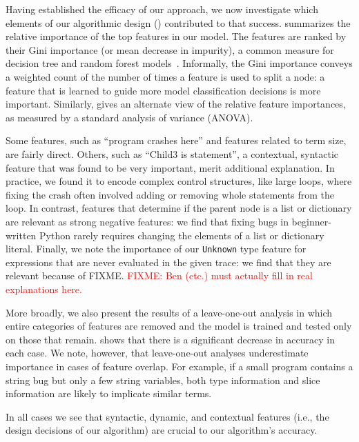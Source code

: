 \documentclass[conference]{IEEEtran}
\newcommand{\fixme}[1]{\textcolor{red}{FIXME: #1}}
\newcommand\lt[1]{{\lstinline|#1|}}
\begin{document}
Having established the efficacy of our approach, we now investigate which
elements of our algorithmic design () contributed to that
success.
 summarizes the relative importance
of the top features in our model. The features are ranked by their
Gini importance (or mean decrease in impurity), a common measure
for decision tree and random forest models~\cite{breiman2001random}. Informally, the
Gini importance conveys a weighted count of the number of times a feature
is used to split a node: a feature that is learned to guide more model
classification decisions is more important. Similarly,  gives
an alternate view of the relative feature importances, as measured by a
standard analysis of variance (ANOVA).

Some features, such as ``program crashes here'' and features
related to term size, are fairly direct. Others, such as ``Child3 is
statement'', a contextual, syntactic feature that was found to be very
important, merit additional explanation. In practice, we found it to
encode complex control structures, like large loops, where fixing the crash
often involved adding or removing whole statements from the loop.
In contrast, features that determine if the parent node
is a list or dictionary are relevant as strong negative features: we find that
fixing bugs in beginner-written
Python rarely requires changing the elements of a list or dictionary literal.
Finally, we note the
importance of our \lt{Unknown} type feature for expressions that are never
evaluated in the given trace: we find that they are relevant because of
FIXME. \fixme{Ben (etc.) must actually fill in real explanations here.}

More broadly, we also present the results of a leave-one-out analysis in which
entire categories of features are removed and the model is trained
and tested only on those that remain.  shows
that there is a significant decrease in accuracy in each case. We note,
however, that leave-one-out analyses underestimate importance in cases of
feature overlap. For example, if a small program contains a string bug but
only a few string variables, both type information and slice information
are likely to implicate similar terms.

In all cases we see that syntactic, dynamic, and contextual features (i.e.,
the design decisions of our algorithm) are crucial to our algorithm's
accuracy.

\end{document}
